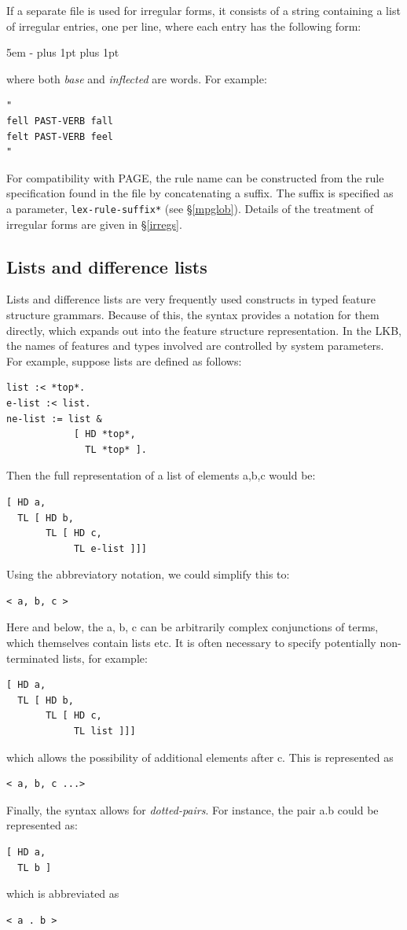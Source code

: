 \documentclass[12pt]{report}
\newcommand{\lkbparam}[1]{{\tt #1}}
\newcommand{\newterm}[1]{{\it #1}}
\begin{document}
If a separate file is used for irregular forms, it consists of
a string containing a list of irregular entries, one per line,
where each entry has the following form:
\begin{list}{}
   {\leftmargin 5em
    \itemindent -\leftmargin
    \itemsep 0pt plus 1pt
    \parsep 0pt plus 1pt}
\end{list}
where both {\it base} and {\it inflected} are words.
For example:
\begin{verbatim}
"
fell PAST-VERB fall
felt PAST-VERB feel
"
\end{verbatim}
For compatibility with PAGE, the rule name can be constructed
from the rule specification found in the file by concatenating a 
suffix.  The suffix is specified as a parameter,
\lkbparam{*lex-rule-suffix*} (see \S\ref{mpglob}).
Details of the treatment of irregular forms are given in
\S\ref{irregs}.

\subsection{Lists and difference lists}
\label{listdesc}

Lists and difference lists are very frequently used constructs
in typed feature structure grammars.  Because of this, the syntax
provides a notation for them directly, which expands out
into the feature structure representation.  In the LKB,
the names of features and types involved are controlled 
by system parameters.  For example, suppose lists are defined as follows:
\begin{verbatim}
list :< *top*.
e-list :< list.
ne-list := list & 
            [ HD *top*,
              TL *top* ].
\end{verbatim}
Then the full representation of a list of elements a,b,c would be:
\begin{verbatim}
[ HD a,
  TL [ HD b,
       TL [ HD c,
            TL e-list ]]]
\end{verbatim}
Using the abbreviatory notation, we could simplify this to:
\begin{verbatim}
< a, b, c >
\end{verbatim}
Here and below,
the a, b, c can be arbitrarily complex conjunctions of terms, which themselves
contain lists etc.
It is often necessary to specify potentially non-terminated lists, for example:
\begin{verbatim}
[ HD a,
  TL [ HD b,
       TL [ HD c,
            TL list ]]]
\end{verbatim}
which allows the possibility of additional elements after c.  This is represented
as 
\begin{verbatim}
< a, b, c ...>
\end{verbatim}
Finally, the syntax allows for \newterm{dotted-pairs}.  For instance, the pair
a.b could be represented as:
\begin{verbatim}
[ HD a,
  TL b ]
\end{verbatim}
which is abbreviated as
\begin{verbatim}
< a . b >
\end{verbatim}
\end{document}
